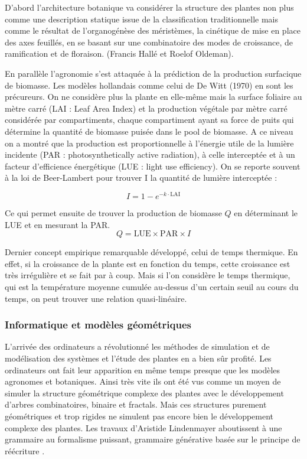 D’abord l’architecture botanique va considérer la structure des plantes non plus comme une description statique issue de la classification traditionnelle mais comme le résultat de l’organogénèse des méristèmes, la cinétique de mise en place des axes feuillés, en se basant sur une combinatoire des modes de croissance, de ramification et de floraison. (Francis Hallé et Roelof Oldeman).

En parallèle l’agronomie s’est attaquée à la prédiction de la production surfacique de biomasse. Les modèles hollandais comme celui de De Witt (1970) en sont les précureurs. On ne considère plus la plante en elle-même mais la surface foliaire au mètre carré (LAI : Leaf Area Index) et la production végétale par mètre carré considérée par compartiments, chaque compartiment ayant sa force de puits qui détermine la quantité de biomasse puisée dans le pool de biomasse. A ce niveau on a montré que la production est proportionnelle à l’énergie utile de la lumière incidente (PAR : photosynthetically active radiation), à celle interceptée et à un facteur d’efficience énergétique (LUE : light use efficiency). On se reporte souvent à la loi de Beer-Lambert pour trouver I la quantité de lumière interceptée : 

\[ I = 1-e^{-k\cdot\mathrm{LAI}} \]

Ce qui permet ensuite de trouver la production de biomasse $Q$
en déterminant le LUE et en mesurant la PAR.
\[ 
  Q = \mathrm{LUE}\times\mathrm{PAR}\times I 
\]

Dernier concept empirique remarquable développé, celui de temps thermique. En effet, si la croissance de la plante est en fonction du temps, cette croissance est très irrégulière et se fait par à coup. Mais si l’on considère le temps thermique, qui est la température moyenne cumulée au-dessus d’un certain seuil au cours du temps, on peut trouver une relation quasi-linéaire.

\subsubsection{Informatique et modèles géométriques}

L’arrivée des ordinateurs a révolutionné les méthodes de simulation et de modélisation des systèmes et l’étude des plantes en a bien sûr profité.
Les ordinateurs ont fait leur apparition en même temps presque que les modèles agronomes et botaniques. Ainsi très vite ils ont été vus comme un moyen de simuler la structure géométrique complexe des plantes avec le développement d’arbres combinatoires, binaire et fractals. Mais ces structures purement géométriques et trop rigides ne simulent pas encore bien le développement complexe des plantes.
Les travaux d’Aristide Lindenmayer aboutissent à une grammaire au formalisme puissant, grammaire générative basée sur le principe de réécriture \cite{LSystem}.

